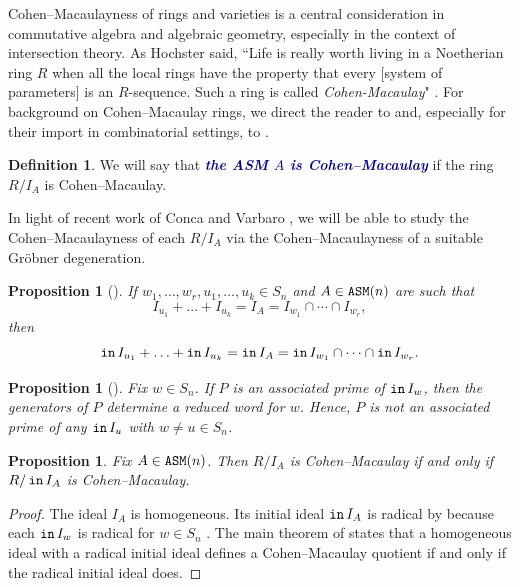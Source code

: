 \documentclass[12 pt]{amsart}
\DeclareMathOperator{\init}{{\tt in}}
\DeclareMathOperator{\asm}{\tt ASM}
\theoremstyle{plain}
\newtheorem{prop}[thm]{Proposition}
\theoremstyle{definition}
\newtheorem{definition}[thm]{Definition}
\theoremstyle{remark}
\newcommand{\newword}[1]{\textcolor{darkblue}{\textbf{\emph{#1}}}}
\begin{document}
{Cohen--Macaulayness of rings and varieties is a central consideration in commutative algebra and algebraic geometry, especially in the context of intersection theory. As Hochster said, ``Life is really worth living in a Noetherian ring $R$ when all the local rings
have the property that every [system of parameters] is an $R$-sequence. Such a ring is called \emph{Cohen-Macaulay}" \cite[P.887]{Hoc78}. For background on Cohen--Macaulay rings, we direct the reader to \cite{BH93} and, especially for their import in combinatorial settings, to \cite{Hoc16}.

\begin{definition} We will say that \newword{the ASM $A$ is Cohen--Macaulay} if the ring $R/I_A$ is Cohen--Macaulay. 
\end{definition}

In light of recent work of Conca and Varbaro \cite{CV20}, we will be able to study the Cohen--Macaulayness of each $R/I_A$ via the Cohen--Macaulayness of a suitable Gr\"obner degeneration.  

\begin{prop}[\cite{Wei17, Knu, KW21}]\label{prop:initialIdealSplit}  If $w_1, \ldots, w_r, u_1, \ldots, u_k \in S_n$ and $A \in \asm(n)$ are such that \[
I_{u_1}+\ldots+I_{u_k} = I_A = I_{w_1} \cap \cdots \cap I_{w_r},
\] then 
\[
\init I_{u_1}+\ldots+\init I_{u_k} = \init I_A = \init I_{w_1} \cap \cdots \cap \init I_{w_r}.
\]
\end{prop}

\begin{prop}[\cite{KM05, BergeronBilley}]\label{prop:components-give-reduced-words}
    Fix $w \in S_n$.  If $P$ is an associated prime of $\init I_w$, then the generators of $P$ determine a reduced word for $w$.  Hence, $P$ is not an associated prime of any $\init I_u$ with $w \neq u \in S_n$.
\end{prop}

 
\begin{prop}
    \label{thm: initIdealCM}
Fix $A \in \asm(n)$.  Then $ R/I_A$ is Cohen--Macaulay if and only if $R/\init I_A$ is Cohen--Macaulay.
\end{prop}
\begin{proof}
The ideal $I_A$ is homogeneous.  Its initial ideal $\init I_A$ is radical by  because each $\init I_w$ is radical for $w \in S_n$ \cite[Theorem B]{KM05}. The main theorem of \cite{CV20} states that a homogeneous ideal with a radical initial ideal defines a Cohen--Macaulay quotient if and only if the radical initial ideal does.
\end{proof}


}
\end{document}
